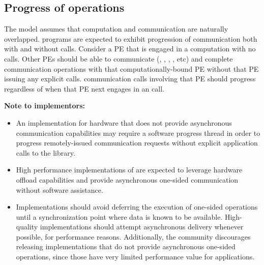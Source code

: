 \subsection{Progress of \openshmem operations}
\label{subsec:progress}
The \openshmem model assumes that computation and communication are naturally \cbstart overlapped. \openshmem programs are expected to exhibit progression of communication both with and without \openshmem calls. Consider a \ac{PE} that is engaged in a computation with no \openshmem calls. Other \ac{PE}s should be able to communicate (, , , , etc) and complete communication operations with that computationally-bound \ac{PE} without that \ac{PE} issuing any explicit \openshmem calls. \openshmem communication calls involving that \ac{PE} should progress regardless of when that \ac{PE} next engages in an \openshmem call.\cbend

\textbf{Note to implementors:}

\cbstart \begin{itemize}
\item An \openshmem implementation for hardware that does not provide asynchronous communication capabilities may require a software progress thread in order to progress remotely-issued communication requests without explicit application calls to the \openshmem library.
\item High performance implementations of \openshmem are expected to leverage hardware offload capabilities and
    provide asynchronous one-sided communication without software assistance.
\item Implementations should avoid deferring the execution of one-sided operations until a synchronization point where data is known to be available. High-quality implementations should attempt asynchronous delivery whenever possible, for performance reasons. Additionally, the \openshmem community discourages releasing \openshmem implementations that do not provide asynchronous one-sided operations, since those have very limited performance value for \openshmem applications.
\end{itemize} \cbend

%
%

